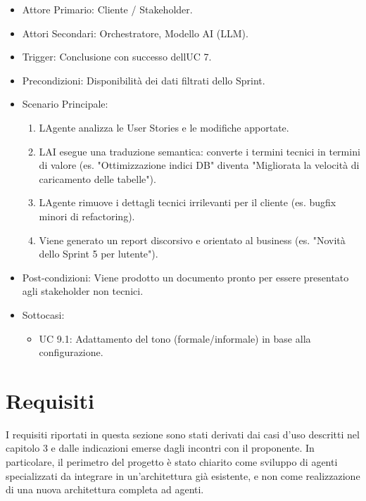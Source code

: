\documentclass[12pt, a4paper]{article}
\begin{document}
\begin{itemize}
\item
  Attore Primario: Cliente / Stakeholder.
\item
  Attori Secondari: Orchestratore, Modello AI (LLM).
\item
  Trigger: Conclusione con successo dell\textquotesingle UC 7.
\item
  Precondizioni: Disponibilità dei dati filtrati dello Sprint.
\item
  Scenario Principale:

  \begin{enumerate}
  \item
    L\textquotesingle Agente analizza le User Stories e le modifiche
    apportate.
  \item
    L\textquotesingle AI esegue una traduzione semantica: converte i
    termini tecnici in termini di valore (es. "Ottimizzazione indici DB"
    diventa "Migliorata la velocità di caricamento delle tabelle").
  \item
    L\textquotesingle Agente rimuove i dettagli tecnici irrilevanti per
    il cliente (es. bugfix minori di refactoring).
  \item
    Viene generato un report discorsivo e orientato al business (es.
    "Novità dello Sprint 5 per l\textquotesingle utente").
  \end{enumerate}
\item
  Post-condizioni: Viene prodotto un documento pronto per essere
  presentato agli stakeholder non tecnici.
\item
  Sottocasi:

  \begin{itemize}
  \item
    UC 9.1: Adattamento del tono (formale/informale) in base alla
    configurazione.
  \end{itemize}
\end{itemize}

\section{Requisiti}\label{requisiti}

I requisiti riportati in questa sezione sono stati derivati dai casi
d'uso descritti nel capitolo 3 e dalle indicazioni emerse dagli incontri
con il proponente. In particolare, il perimetro del progetto è stato
chiarito come sviluppo di agenti specializzati da integrare in
un'architettura già esistente, e non come realizzazione di una nuova
architettura completa ad agenti.
\end{document}
